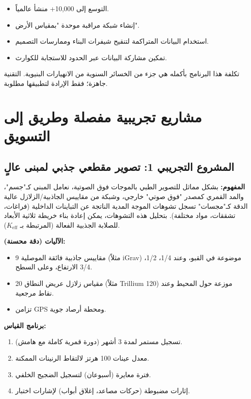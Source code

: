 \documentclass[12pt,a4paper]{article}
\newcommand{\Keff}{K_{\mathrm{eff}}}
\theoremstyle{remark}
\begin{document}
	\begin{itemize}
		\item التوسع إلى 10,000+ منشأ عالمياً.
		\item إنشاء شبكة مراقبة موحدة "بمقياس الأرض".
		\item استخدام البيانات المتراكمة لتنقيح شيفرات البناء وممارسات التصميم.
		\item تمكين مشاركة البيانات عبر الحدود للاستجابة للكوارث.
	\end{itemize}
	
	تكلفة هذا البرنامج بأكمله هي جزء من الخسائر السنوية من الانهيارات البنيوية. التقنية جاهزة؛ فقط الإرادة لتطبيقها مطلوبة.
	
	\section{مشاريع تجريبية مفصلة وطريق إلى التسويق}
	
	\subsection{المشروع التجريبي 1: تصوير مقطعي جذبي لمبنى عالٍ}
	
	\textbf{المفهوم:} بشكل مماثل للتصوير الطبي بالموجات فوق الصوتية، نعامل المبنى كـ"جسم"، والمد القمري كمصدر "فوق صوتي" خارجي، وشبكة من مقاييس الجاذبية/الزلازل عالية الدقة كـ"مجسات" تسجل تشوهات الموجة المدية الناتجة عن التباينات الداخلية (فراغات، تشققات، مواد مختلفة). بتحليل هذه التشوهات، يمكن إعادة بناء خريطة ثلاثية الأبعاد للصلابة الجذبية الفعالة (المرتبطة بـ \(\Keff\)).
	
	\textbf{الآليات (دقة محسنة):}
	\begin{itemize}
		\item 9 مقاييس جاذبية فائقة الموصلية (مثلاً iGrav) موضوعة في القبو، وعند 1/4، 1/2، 3/4 الارتفاع، وعلى السطح.
		\item 20 مقياس زلازل عريض النطاق (مثلاً Trillium 120) موزعة حول المحيط وعند نقاط مرجعية.
		\item تزامن GPS ومحطة أرصاد جوية.
	\end{itemize}
	
	\textbf{برنامج القياس:}
	\begin{enumerate}
		\item تسجيل مستمر لمدة 3 أشهر (دورة قمرية كاملة مع هامش).
		\item معدل عينات 100 هرتز لالتقاط الرنينات الممكنة.
		\item فترة معايرة (أسبوعان) لتسجيل الضجيج الخلفي.
		\item إثارات مضبوطة (حركات مصاعد، إغلاق أبواب) لإشارات اختبار.
	\end{enumerate}
	
\end{document}
